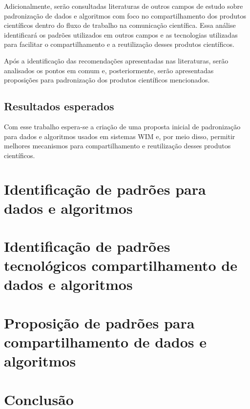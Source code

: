 \documentclass{ufscThesis}
\begin{document}
Adicionalmente, serão consultadas literaturas de outros campos de estudo sobre padronização de dados e algoritmos com foco no compartilhamento dos produtos científicos dentro do fluxo de trabalho na comunicação científica. Essa análise identificará os padrões utilizados em outros campos e as tecnologias utilizadas para facilitar o compartilhamento e a reutilização desses produtos científicos.

Após a identificação das recomendações apresentadas nas literaturas, serão analisados os pontos em comum e, posteriormente, serão apresentadas proposições para padronização dos produtos científicos mencionados.

\section{Resultados esperados}\label{introducao-resultados}
Com esse trabalho espera-se a criação de uma proposta inicial de padronização para dados e algoritmos usados em sistemas WIM e, por meio disso, permitir melhores mecanismos para compartilhamento e reutilização desses produtos científicos.



\chapter{Identificação de padrões para dados e algoritmos}\label{id-standards}


\chapter{Identificação de padrões tecnológicos compartilhamento de dados e algoritmos}\label{id-tech-standards}


\chapter{Proposição de padrões para compartilhamento de dados e algoritmos}\label{standards-proposition}


\chapter{Conclusão}\label{conclusao}
\end{document}
